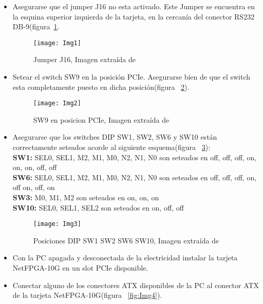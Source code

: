 \begin{itemize}
\item Asegurarse que el jumper J16 no esta activado. Este Jumper se encuentra en la esquina superior izquierda de la tarjeta, en la cercanía del conector RS232 DB-9(figura~\ref{fig:Img1}.

\begin{figure}[htbp!] 
\centering    
\texttt{[image: Img1]}
\caption[Jumper J16]{Jumper J16, Imagen extra\'ida de \citep{NetFPGA6}}
\label{fig:Img1}
\end{figure}

\item Setear el switch SW9 en la posición PCIe. Asegurarse bien de que el switch esta completamente puesto en dicha posición(figura ~\ref{fig:Img2}).

\begin{figure}[htbp!] 
\centering    
\texttt{[image: Img2]}
\caption[SW9 en posicion PCIe]{SW9 en posicion PCIe, Imagen extra\'ida de \citep{NetFPGA6}}
\label{fig:Img2}
\end{figure}

\item Asegurarse que los switches DIP SW1, SW2, SW6 y SW10 están correctamente seteados acorde al siguiente esquema(figura ~\ref{fig:Img3}):\\

\textbf{SW1:} SEL0, SEL1, M2, M1, M0, N2, N1, N0 son seteados en off, off, off, on, on, on, off, off\\
\textbf{SW6:} SEL0, SEL1, M2, M1, M0, N2, N1, N0 son seteados en off, off, off, on, off on, off, on\\
\textbf{SW3:} M0, M1, M2 son seteados en on, on, on\\
\textbf{SW10:} SEL0, SEL1, SEL2 son seteados en on, off, off\\

\begin{figure}[htbp!] 
\centering    
\texttt{[image: Img3]}
\caption[Posiciones DIP SW1 SW2 SW6 SW10]{Posiciones DIP SW1 SW2 SW6 SW10, Imagen extra\'ida de \citep{NetFPGA6}}
\label{fig:Img3}
\end{figure}

\item Con la PC apagada y desconectada de la electricidad instalar la tarjeta NetFPGA-10G en un slot PCIe disponible.

\item Conectar alguno de los conectores ATX disponibles de la PC al conector ATX de la tarjeta NetFPGA-10G(figura ~\ref{fig:Img4}).


\end{itemize}
